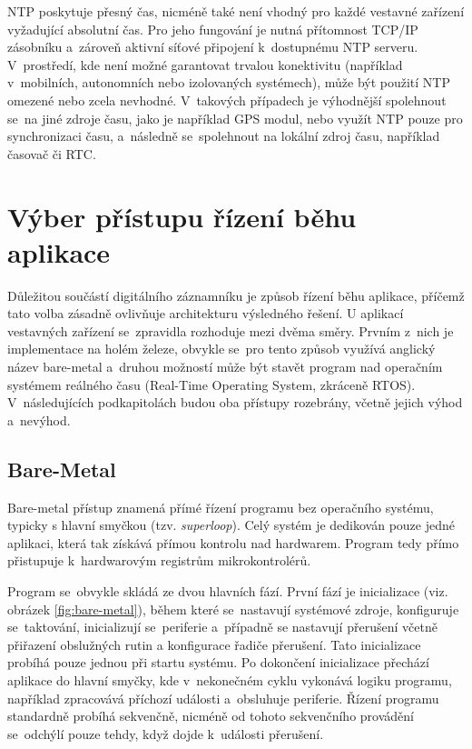 NTP poskytuje přesný čas, nicméně také není vhodný pro každé vestavné zařízení vyžadující absolutní čas. Pro jeho fungování je nutná přítomnost TCP/IP zásobníku a~zároveň aktivní síťové připojení k~dostupnému NTP serveru. V~prostředí, kde není možné garantovat trvalou konektivitu (například v~mobilních, autonomních nebo izolovaných systémech), může být použití NTP omezené nebo zcela nevhodné. V~takových případech je výhodnější spolehnout se~na jiné zdroje času, jako je například GPS modul, nebo využít NTP pouze pro synchronizaci času, a~následně se~spolehnout na lokální zdroj času, například časovač či RTC.

\section{Výber přístupu řízení běhu aplikace}
Důležitou součástí digitálního záznamníku je způsob řízení běhu aplikace, příčemž tato volba zásadně ovlivňuje architekturu výsledného řešení. U aplikací vestavných zařízení se~zpravidla rozhoduje mezi dvěma směry. Prvním z~nich je implementace na holém železe, obvykle se~pro tento způsob využívá anglický název bare-metal a~druhou možností může být stavět program nad operačním systémem reálného času (Real-Time Operating System, zkráceně RTOS). V~následujících podkapitolách budou oba přístupy rozebrány, včetně jejich výhod a~nevýhod. 

\subsection{Bare-Metal}
Bare-metal přístup znamená přímé řízení programu bez operačního systému, typicky s hlavní smyčkou (tzv. \emph{superloop}). Celý systém je dedikován pouze jedné aplikaci, která tak získává přímou kontrolu nad hardwarem. Program tedy přímo přistupuje k~hardwarovým registrům mikrokontrolérů.~\cite{sysgo_baremetal_vs_rtos}

Program se~obvykle skládá ze dvou hlavních fází. První fází je inicializace (viz. obrázek \ref{fig:bare-metal}), během které se~nastavují systémové zdroje, konfiguruje se~taktování, inicializují se~periferie a~případně se nastavují přerušení včetně přiřazení obslužných rutin a konfigurace řadiče přerušení. Tato inicializace probíhá pouze jednou při startu systému. Po dokončení inicializace přechází aplikace do hlavní smyčky, kde v~nekonečném cyklu vykonává logiku programu, například zpracovává příchozí události a~obsluhuje periferie. Řízení programu standardně probíhá sekvenčně, nicméně od tohoto sekvenčního provádění se~odchýlí pouze tehdy, když dojde k~události přerušení.~\cite{sysgo_baremetal_vs_rtos}

